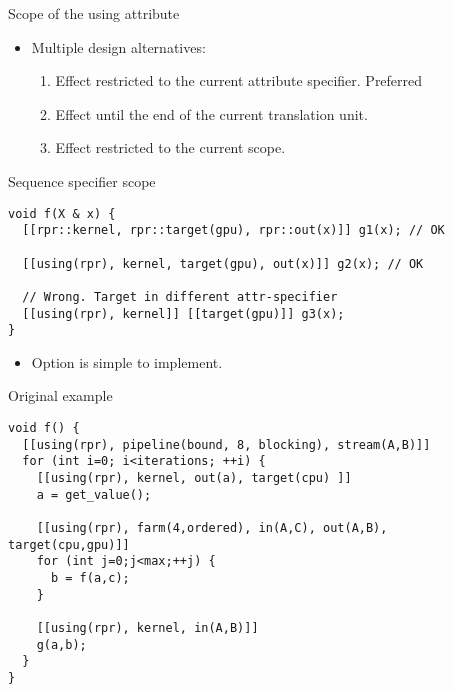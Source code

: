 \begin{frame}[t]{Scope of the using attribute}
\begin{itemize}
  \item Multiple design alternatives:
    \begin{enumerate}[1.]
      \item Effect restricted to the current attribute specifier. \alert{Preferred}
      \item Effect until the end of the current translation unit.
      \item Effect restricted to the current scope.
    \end{enumerate}
\end{itemize}
\end{frame}

\begin{frame}[t,fragile]{Sequence specifier scope}
\begin{lstlisting}
void f(X & x) {
  [[rpr::kernel, rpr::target(gpu), rpr::out(x)]] g1(x); // OK

  [[using(rpr), kernel, target(gpu), out(x)]] g2(x); // OK

  // Wrong. Target in different attr-specifier
  [[using(rpr), kernel]] [[target(gpu)]] g3(x); 
}
\end{lstlisting}

\begin{itemize}
  \item Option is simple to implement.
\end{itemize}
\end{frame}

\begin{frame}[t,fragile]{Original example}
\begin{lstlisting}[basicstyle=\footnotesize]
void f() {
  [[using(rpr), pipeline(bound, 8, blocking), stream(A,B)]]
  for (int i=0; i<iterations; ++i) {
    [[using(rpr), kernel, out(a), target(cpu) ]]
    a = get_value();
    
    [[using(rpr), farm(4,ordered), in(A,C), out(A,B), target(cpu,gpu)]]
    for (int j=0;j<max;++j) {
      b = f(a,c);
    }

    [[using(rpr), kernel, in(A,B)]]
    g(a,b);
  }
}
\end{lstlisting}
\end{frame}
